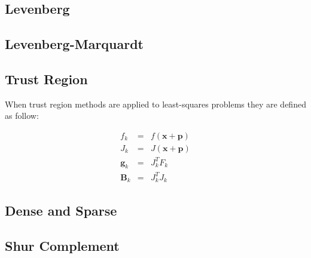 \documentclass[peerreview,onecolumn]{IEEEtran}
\begin{document}
\subsection{Levenberg}


\subsection{Levenberg-Marquardt}

\subsection{Trust Region}

When trust region methods are applied to least-squares problems they are defined as follow:

\begin{eqnarray}
f_k &=& f(\bm{x}+\bm{p}) \\
J_k &=& J(\bm{x}+\bm{p}) \\
\bm{g}_k &=& J^T_k F_k  \\
\bm{B}_k &=& J_k^T J_k
\end{eqnarray}


\subsection{Dense and Sparse}

\subsection{Shur Complement}



\end{document}
